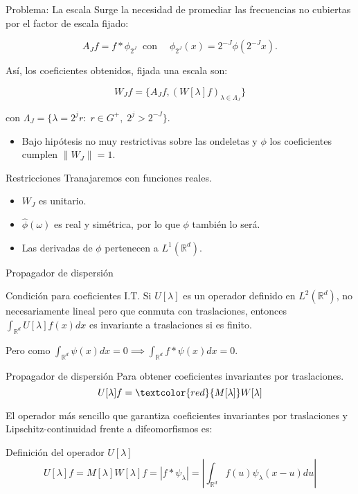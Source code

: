 \documentclass[aspectratio=43]{beamer}
\begin{document}
\begin{frame}{Problema: La escala}
  Surge la necesidad de promediar las frecuencias no cubiertas por el factor de escala fijado:

  \begin{equation*}
    A_Jf=f \ast \phi_ {2^J} \; \; \text{con} \quad \; \phi_ {2^J}(x)=2^{-J} \phi(2^{-J}x).
  \end{equation*}

  Así, los coeficientes obtenidos, fijada una escala son:

  $$W_J f=\lbrace A_Jf,(W[\lambda]f)_{\lambda \in \Lambda_J} \rbrace$$ 

  con $\Lambda_J=\lbrace \lambda=2^jr:\;r\in G^{+}, \; 2^j>2^{-J}\rbrace$.

  \begin{itemize}
    \item Bajo hipótesis no muy restrictivas sobre las ondeletas y $\phi$ los coeficientes cumplen $\| W_J \|=1$.
  \end{itemize}
\end{frame}

\begin{frame}{Restricciones}
  Tranajaremos con funciones reales.
  \begin{itemize}
    \item $W_J$ es unitario. 
    \item $\widehat{\phi}(\omega)$ es real y simétrica, por lo que $\phi$ también lo será. 
    \item Las derivadas de $\phi$ pertenecen a $L^1(\mathbb{R}^d)$.
  \end{itemize}
\end{frame}

\begin{frame}{Propagador de dispersión}

  \begin{alertblock}{Condición para coeficientes I.T.}
    Si $U[\lambda]$ es un operador definido en $L^2(\mathbb{R}^d)$, no necesariamente lineal pero que conmuta con traslaciones, entonces $\int_{\mathbb{R}^d} U[\lambda]f(x)dx$ es invariante a traslaciones si es finito.
  \end{alertblock}
  \medskip
  Pero como $\int_{\mathbb{R}^d} \psi(x)dx=0 \implies \int_{\mathbb{R}^d} f \ast \psi(x) dx=0$. 
\end{frame}

\begin{frame}{Propagador de dispersión}
  Para obtener coeficientes invariantes por traslaciones. 
  $$U[\lambda]f= \textcolor{red}{M[\lambda]} W[\lambda]$$

  \medskip

  El operador más sencillo que garantiza coeficientes invariantes por traslaciones y Lipschitz-continuidad frente a difeomorfismos es:

  \begin{block}{Definición del operador $U[\lambda]$}
    $$U[\lambda]f=M[\lambda]W[\lambda]f=|f \ast \psi_\lambda|=\left | \int_{\mathbb{R}^d} f(u)\psi_\lambda(x-u) du \right|$$
  \end{block}
\end{frame}
\end{document}
